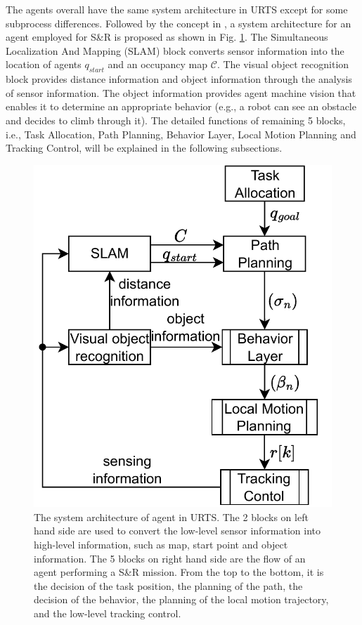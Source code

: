 \documentclass{ieeeaccess}
\begin{document}
The agents overall have the same system architecture in URTS except for some subprocess differences. Followed by the concept in \cite{paden2016survey}, a system architecture for an agent employed for S\&R is proposed as shown in Fig. \ref{fig:sys}. The Simultaneous Localization And Mapping (SLAM) block converts sensor information into the location of agents $q_{start}$ and an occupancy map $\mathcal{C}$. The visual object recognition block provides distance information and object information through the analysis of sensor information. The object information provides agent machine vision that enables it to determine an appropriate behavior (e.g., a robot can see an obstacle and decides to climb through it). The detailed functions of remaining 5 blocks, i.e., Task Allocation, Path Planning, Behavior Layer, Local Motion Planning and Tracking Control, will be explained in the following subsections.


\begin{figure}[htbp]
\centering
\includegraphics[scale=.5]{fig/sys.pdf}\caption{The system architecture of agent in URTS. The 2 blocks on left hand side are used to convert the low-level sensor information into high-level information, such as map, start point and object information. The 5 blocks on right hand side are the flow of an agent performing a S\&R mission. From the top to the bottom, it is the decision of the task position, the planning of the path, the decision of the behavior, the planning of the local motion trajectory, and the low-level tracking control.}%
\label{fig:sys}
\end{figure}
\end{document}
